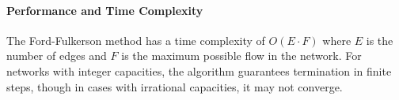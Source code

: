 \paragraph{Performance and Time Complexity}
The Ford-Fulkerson method has a time complexity of $O(E \cdot F)$ where $E$ is the number of edges and 
$F$ is the maximum possible flow in the network. For networks with integer capacities, the algorithm guarantees termination in finite steps, though in cases with irrational capacities, it may not converge. 


